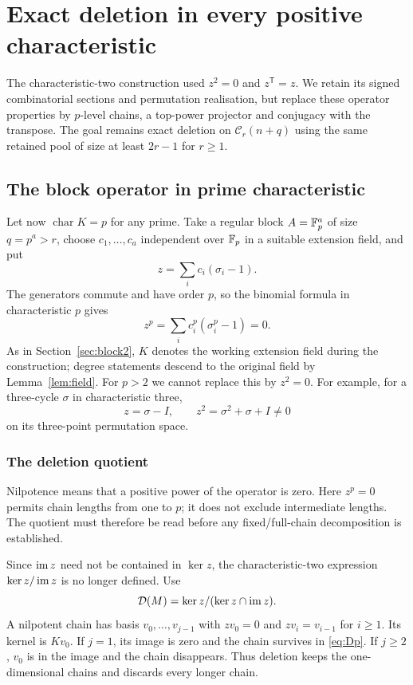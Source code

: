 \documentclass[11pt,a4paper]{article}
\theoremstyle{definition}\newtheorem{definition}[theorem]{Definition}
\theoremstyle{remark}\newtheorem{remark}[theorem]{Remark}
\newcommand{\D}{\mathcal D}\newcommand{\Del}{\mathcal D}\newcommand{\Lift}{\mathsf L}
\begin{document}
\section{Exact deletion in every positive characteristic}\label{sec:odd}
The characteristic-two construction used $z^2=0$ and
$z^{\mathsf T}=z$. We retain its signed combinatorial sections and
permutation realisation, but replace these operator properties by
$p$-level chains, a top-power projector and conjugacy with the
transpose. The goal remains exact deletion on $\mathcal C_r(n+q)$
using the same retained pool of size at least $2r-1$ for $r\ge1$.

\subsection{The block operator in prime characteristic}
Let now $\operatorname{char}K=p$ for any prime. Take a regular block $A=\mathbb F_p^a$ of size $q=p^a>r$, choose $c_1,\ldots,c_a$ independent over $\mathbb F_p$ in a suitable extension field, and put
\[z=\sum_i c_i(\sigma_i-1).
\]
The generators commute and have order $p$, so the binomial formula in characteristic $p$ gives
\[z^p=\sum_i c_i^p(\sigma_i^p-1)=0.
\]
As in Section~\ref{sec:block2}, $K$ denotes the working extension
field during the construction; degree statements descend to the
original field by Lemma~\ref{lem:field}.
For $p>2$ we cannot replace this by $z^2=0$. For example, for a three-cycle $\sigma$ in characteristic three,
\[z=\sigma-I,\qquad z^2=\sigma^2+\sigma+I\ne0
\]
on its three-point permutation space.

\subsubsection{The deletion quotient}
Nilpotence means that a positive power of the operator is zero.
Here $z^p=0$ permits chain lengths from one to $p$; it does not
exclude intermediate lengths. The quotient must therefore be read
before any fixed/full-chain decomposition is established.

Since $\operatorname{im} z$ need not be contained in $\ker z$, the characteristic-two expression $\ker z/\operatorname{im} z$ is no longer defined. Use
\begin{equation}\label{eq:Dp}
\D(M)=\ker z/(\ker z\cap\im z).
\end{equation}
A nilpotent chain has basis $v_0,\ldots,v_{j-1}$ with $zv_0=0$ and $zv_i=v_{i-1}$ for $i\ge1$. Its kernel is $Kv_0$. If $j=1$, its image is zero and the chain survives in \eqref{eq:Dp}. If $j\ge2$, $v_0$ is in the image and the chain disappears. Thus deletion keeps the one-dimensional chains and discards every longer chain.
\end{document}

